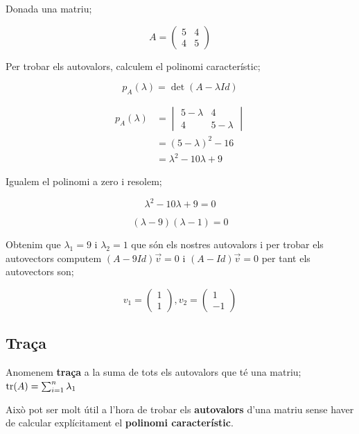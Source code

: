 \documentclass[12pt]{article}
\begin{document}
\begin{examplebox}{}
    Donada una matriu;

    \[A = \begin{pmatrix}
        5 & 4\\
        4 & 5
    \end{pmatrix}\]

    Per trobar els autovalors, calculem el polinomi característic;

    \[
    p_A(\lambda) = \det(A - \lambda Id)
    \]

    \[
    \begin{aligned}
    p_A(\lambda)
    &= \begin{vmatrix}
        5-\lambda & 4\\
        4 & 5-\lambda
    \end{vmatrix}\\
    &= (5-\lambda)^2 - 16\\
    &= \lambda^2 - 10\lambda + 9
    \end{aligned}
    \]

    Igualem el polinomi a zero i resolem;

    \[
    \lambda^2 - 10\lambda + 9 = 0
    \]

    \[
    (\lambda-9)(\lambda-1)=0
    \]

    Obtenim que $\lambda_1 = 9$ i $\lambda_2 = 1$ que són els nostres autovalors i per trobar els autovectors computem $(A - 9Id)\vec{v} = 0$ i $(A - Id)\vec{v} = 0$ per tant els autovectors son;

    \[v_1 = \begin{pmatrix}
        1\\
        1
    \end{pmatrix}, v_2 = \begin{pmatrix}
        1\\
        -1
    \end{pmatrix}\]
\end{examplebox}


\subsection{Traça}

Anomenem \textbf{traça} a la suma de tots els autovalors que té una matriu; $\tr(A) = \sum_{i = 1}^{n} \lambda_1$

Això pot ser molt útil a l'hora de trobar els \textbf{autovalors} d'una matriu sense haver de calcular explícitament el \textbf{polinomi característic}.
\end{document}
